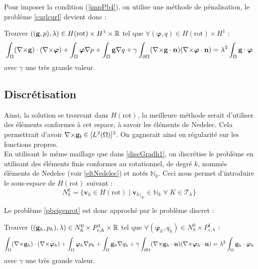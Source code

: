 Pour imposer la condition (\ref{impPb4}), on utilise une méthode de pénalisation, le problème \ref{curlcurl} devient donc :
\begin{pb}\label{pbeigenrot}
Trouver $((\mathbf{g},p),\lambda)\in H(\mathrm{rot}) \times H^1 \times {\mathbb{R}}$ tel que $\forall (\bm{\varphi},q)\in H(\mathrm{rot}) \times H^1$ :
\begin{equation*}
\int_\Omega ({\nabla\times}\mathbf{g})\cdot({\nabla\times}\bm{\varphi}) + \int_\Omega\bm{\varphi}{\nabla} p + \int_\Omega \mathbf{g}{\nabla} q + \gamma\int_{\partial\Omega}({\nabla\times}\mathbf{g}\cdot\mathbf{n})({\nabla\times}\bm{\varphi}\cdot\mathbf{n}) = \lambda^2\int_\Omega \mathbf{g}\cdot\bm{\varphi}
\end{equation*}
avec $\gamma$ une très grande valeur.
\end{pb}

\subsection{Discrétisation}
Ainsi, la solution se trouvant dans $H(\mathrm{rot})$, la meilleure méthode serait d'utiliser des éléments conformes à cet espace, à savoir les éléments de Nedelec. Cela permettrait d'avoir ${\nabla\times}\mathbf{g_i}\in [L^2(\Omega)]^3$. On gagnerait ainsi en régularité sur les fonctions propres.\\

En utilisant le même maillage que dans \ref{discGradh1}, on discrétise le problème en utilisant des éléments finis conformes au rotationnel, de degré $k$, nommés éléments de Nedelec (voir \ref{eltNedelec}) et notés $\mathbb{N}_k$. Ceci nous permet d'introduire le sous-espace de $H(\mathrm{rot})$ suivant :
\[ N^k_h = \{ \mathbf{v}_h \in H(\mathrm{rot}) \; |\; \mathbf{v}_h{}_{|_K} \in \mathbb{N}_k\; \forall\; K \in \mathcal{T}_h\}\]

Le problème \ref{pbeigenrot} est donc approché par le problème discret :
\begin{pb}
Trouver $((\mathbf{g}_h,p_h),\lambda)\in N^0_h\times P_{c,h}^1 \times {\mathbb{R}}$ tel que $\forall  (\bm{\varphi}_h,q_h)\in N^0_h\times P_{c,h}^1$ :
\begin{equation*}
\int_\Omega ({\nabla\times}\mathbf{g}_h)\cdot({\nabla\times}\bm{\varphi}_h) + \int_\Omega\bm{\varphi}_h{\nabla} p_h + \int_\Omega \mathbf{g}_h{\nabla} q_h + \gamma\int_{\partial\Omega}({\nabla\times}\mathbf{g}_h\cdot\mathbf{n})({\nabla\times}\bm{\varphi}_h\cdot\mathbf{n}) = \lambda^2\int_\Omega \mathbf{g}_h\cdot\bm{\varphi}_h
\end{equation*}
avec $\gamma$ une très grande valeur.
\end{pb}

